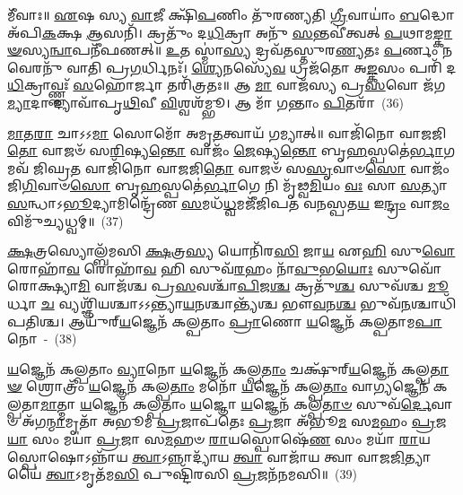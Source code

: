 𑌮𑍀᳴𑌵𑌾𑌃॥ \ul{𑌏}\-𑌷 𑌸𑍍𑌯 \ul{𑌵𑌾}\-𑌜𑍀 𑌕𑍍𑌷𑌿᳴\-\ul{𑌪}\-𑌣𑌿𑌂 𑌤𑍁᳴𑌰𑌣𑍍𑌯𑌤𑌿 \ul{𑌗𑍍𑌰𑍀}\-𑌵𑌾𑌯𑌾𑌂॑ \ul{𑌬}\-𑌦𑍍𑌧𑍋 𑌅᳴𑌪𑌿\-\ul{𑌕}\-𑌕𑍍𑌷 \ul{𑌆}\-𑌸𑌨𑌿᳴। 𑌕𑍍𑌰𑌤𑍁𑌂᳴ 𑌦\-\ul{𑌧𑌿}\-𑌕𑍍𑌰𑌾 𑌅𑌨𑍁᳴ \ul{𑌸}\-𑌨𑍍𑌤𑌵𑍀॑𑌤𑍍𑌵𑌤𑍍 \ul{𑌪}\-𑌥𑌾𑌮\-\ul{𑌙𑍍𑌕𑌾}\-\-\ul{𑍟}\-𑌸𑍍𑌯\-\ul{𑌨𑍍𑌵𑌾}\-𑌪𑌨𑍀᳴𑌫𑌣𑌤𑍍॥ \ul{𑌉}\-𑌤 𑌸𑍍𑌮𑌾॑\-\ul{𑌸𑍍𑌯} 𑌦𑍍𑌰𑌵᳴𑌤𑌸𑍍𑌤𑍁𑌰\-\ul{𑌣𑍍𑌯}\-𑌤𑌃 \ul{𑌪}\-𑌰𑍍𑌣𑌂 𑌨 𑌵𑍇𑌰𑌨𑍁᳴ 𑌵𑌾𑌤𑌿 𑌪𑍍𑌰\-\ul{𑌗}\-𑌰𑍍𑌧𑌿𑌨𑌃᳴। \ul{𑌶𑍍𑌯𑍇}\-𑌨𑌸𑍍𑌯𑍇᳴\-\ul{𑌵} 𑌧𑍍𑌰𑌜᳴𑌤𑍋 𑌅\-\ul{𑌙𑍍𑌕}\-𑌸𑌂 𑌪𑌰𑌿᳴ 𑌦\-\ul{𑌧𑌿}\-𑌕𑍍𑌰𑌾𑌵𑍍𑌣𑍍𑌣𑌃᳴ \ul{𑌸}\-𑌹𑍋𑌰𑍍𑌜𑌾 𑌤𑌰𑌿᳴𑌤𑍍𑌰𑌤𑌃॥ 𑌆 \ul{𑌮𑌾} 𑌵𑌾𑌜᳴𑌸𑍍𑌯 𑌪𑍍𑌰\-\ul{𑌸}\-𑌵𑍋 𑌜᳴𑌗\-\ul{𑌮𑍍𑌯𑌾}\-𑌦𑌾 𑌦𑍍𑌯𑌾𑌵𑌾᳴𑌪𑍃\-\ul{𑌥𑌿}\-𑌵𑍀 \ul{𑌵𑌿}\-𑌶𑍍𑌵𑌶᳴𑌮𑍍𑌭𑍂। 𑌆 𑌮𑌾᳴ 𑌗𑌨𑍍𑌤𑌾𑌂 \ul{𑌪𑌿}\-𑌤𑌰𑌾᳴~(36)

\-\ul{𑌮𑌾}\-𑌤\-\ul{𑌰𑌾} 𑌚𑌾\-𑌽\-𑌽\-\ul{𑌮𑌾} 𑌸𑍋𑌮𑍋᳴ 𑌅𑌮𑍃\-\ul{𑌤}\-𑌤𑍍𑌵𑌾𑌯᳴ 𑌗𑌮𑍍𑌯𑌾𑌤𑍍॥ 𑌵𑌾𑌜𑌿᳴𑌨𑍋 𑌵𑌾𑌜𑌜𑌿\-\ul{𑌤𑍋} 𑌵𑌾𑌜𑍞᳴ 𑌸\-\ul{𑌰𑌿}\-𑌷𑍍𑌯\-\ul{𑌨𑍍𑌤𑍋} 𑌵𑌾𑌜𑌂᳴ \ul{𑌜𑍇}\-𑌷𑍍𑌯\-\ul{𑌨𑍍𑌤𑍋} 𑌬𑍃\-\ul{𑌹}\-𑌸𑍍𑌪𑌤𑍇॑\-\ul{𑌰𑍍𑌭𑌾}\-𑌗𑌮𑌵᳴ 𑌜𑌿𑌘𑍍𑌰\-\ul{𑌤} 𑌵𑌾𑌜𑌿᳴𑌨𑍋 𑌵𑌾𑌜𑌜𑌿\-\ul{𑌤𑍋} 𑌵𑌾𑌜𑍞᳴ 𑌸\-\ul{𑌸𑍃}\-𑌵𑌾𑍞\-\ul{𑌸𑍋} 𑌵𑌾𑌜𑌂᳴ 𑌜𑌿\-\ul{𑌗𑌿}\-𑌵𑌾𑍞\-\ul{𑌸𑍋} 𑌬𑍃\-\ul{𑌹}\-𑌸𑍍𑌪𑌤𑍇॑\-\ul{𑌰𑍍𑌭𑌾}\-𑌗𑍇 𑌨𑌿 𑌮𑍃᳴𑌢𑍍𑌵\-\ul{𑌮𑌿}\-𑌯𑌂 \ul{𑌵𑌃} 𑌸𑌾 \ul{𑌸}\-𑌤𑍍𑌯𑌾 \ul{𑌸}\-𑌨𑍍𑌧𑌾\-𑌽\-\ul{𑌭𑍂}\-𑌦𑍍𑌯𑌾𑌮𑌿𑌨𑍍𑌦𑍍𑌰𑍇᳴𑌣 \ul{𑌸}\-𑌮𑌧᳴\-\ul{𑌧𑍍𑌵}\-𑌮𑌜𑍀᳴𑌜𑌿𑌪𑌤 𑌵𑌨𑌸𑍍𑌪𑌤\-\ul{𑌯} 𑌇\-\ul{𑌨𑍍𑌦𑍍𑌰𑌂} 𑌵𑌾\-\ul{𑌜𑌂} 𑌵𑌿𑌮𑍁᳴𑌚𑍍𑌯𑌧𑍍𑌵𑌮𑍍॥~(37)

{\anuvakamend[{\-\ul{𑌸𑍍𑌕}\-\-\ul{𑌭𑍍𑌨𑍀}\-\-\ul{𑌤} \ul{𑌯𑍁}\-\-\ul{𑌯}\-\-\ul{𑌵}\-\-\ul{𑌨𑍍𑌪𑌿}\-𑌤\-\ul{𑌰𑌾} 𑌦𑍍𑌵𑌿𑌚᳴𑌤𑍍𑌵𑌾𑌰𑌿𑍞𑌶𑌚𑍍𑌚}]}%

\-\ul{𑌕𑍍𑌷}\-𑌤𑍍𑌰𑌸𑍍𑌯𑍋𑌲𑍍𑌬᳴𑌮𑌸𑌿 \ul{𑌕𑍍𑌷}\-𑌤𑍍𑌰\-\ul{𑌸𑍍𑌯} 𑌯𑍋𑌨𑌿᳴𑌰\-\ul{𑌸𑌿} 𑌜𑌾\-\ul{𑌯} 𑌏\-\ul{𑌹𑌿} 𑌸𑍁\-\ul{𑌵𑍋} 𑌰𑍋𑌹𑌾᳴\-\ul{𑌵} 𑌰𑍋𑌹𑌾᳴\-\ul{𑌵} 𑌹𑌿 𑌸𑍁𑌵᳴\-\ul{𑌰}\-𑌹𑌂 𑌨𑌾᳴\-\ul{𑌵𑍁}\-𑌭\-\ul{𑌯𑍋𑌃} 𑌸𑍁𑌵𑍋᳴ 𑌰𑍋𑌕𑍍𑌷𑍍𑌯𑌾\-\ul{𑌮𑌿} 𑌵𑌾𑌜᳴𑌶𑍍𑌚 𑌪𑍍𑌰\-\ul{𑌸}\-𑌵𑌶𑍍𑌚𑌾᳴\-\ul{𑌪𑌿}\-𑌜\-\ul{𑌶𑍍𑌚} 𑌕𑍍𑌰𑌤𑍁᳴\-\ul{𑌶𑍍𑌚} 𑌸𑍁𑌵᳴𑌶𑍍𑌚 \ul{𑌮𑍂}\-𑌰𑍍𑌧𑌾 \ul{𑌚} 𑌵𑍍𑌯𑌶𑍍𑌞𑌿᳴𑌯𑌶𑍍𑌚𑌾\-𑌽\-𑌽𑌨𑍍𑌤𑍍𑌯𑌾\-\ul{𑌯}\-𑌨𑌶𑍍𑌚𑌾𑌨𑍍𑌤𑍍𑌯᳴𑌶𑍍𑌚 𑌭𑍗\-\ul{𑌵}\-𑌨\-\ul{𑌶𑍍𑌚} 𑌭𑍁𑌵᳴\-\ul{𑌨}\-𑌶𑍍𑌚𑌾𑌧𑌿᳴𑌪𑌤𑌿𑌶𑍍𑌚। 𑌆𑌯𑍁᳴𑌰𑍍‌\-\ul{𑌯}\-𑌜𑍍𑌞𑍇𑌨᳴ 𑌕𑌲𑍍𑌪𑌤𑌾𑌂 \ul{𑌪𑍍𑌰𑌾}\-𑌣𑍋 \ul{𑌯}\-𑌜𑍍𑌞𑍇𑌨᳴ 𑌕𑌲𑍍𑌪𑌤𑌾𑌮\-\ul{𑌪𑌾}\-𑌨𑍋~-~(38)

\-\ul{𑌯}\-𑌜𑍍𑌞𑍇𑌨᳴ 𑌕𑌲𑍍𑌪𑌤𑌾𑌂 \ul{𑌵𑍍𑌯𑌾}\-𑌨𑍋 \ul{𑌯}\-𑌜𑍍𑌞𑍇𑌨᳴ 𑌕𑌲𑍍𑌪\-\ul{𑌤𑌾𑌂} 𑌚𑌕𑍍𑌷𑍁᳴𑌰𑍍‌\-\ul{𑌯}\-𑌜𑍍𑌞𑍇𑌨᳴ 𑌕𑌲𑍍𑌪\-\ul{𑌤𑌾}\-\-\ul{𑍟} 𑌶𑍍𑌰𑍋𑌤𑍍𑌰𑌂᳴ \ul{𑌯}\-𑌜𑍍𑌞𑍇𑌨᳴ 𑌕𑌲𑍍𑌪\-\ul{𑌤𑌾𑌂} 𑌮𑌨𑍋᳴ \ul{𑌯}\-𑌜𑍍𑌞𑍇𑌨᳴ 𑌕𑌲𑍍𑌪\-\ul{𑌤𑌾𑌂} 𑌵𑌾\-\ul{𑌗𑍍𑌯}\-𑌜𑍍𑌞𑍇𑌨᳴ 𑌕𑌲𑍍𑌪𑌤𑌾\-\ul{𑌮𑌾}\-𑌤𑍍𑌮𑌾 \ul{𑌯}\-𑌜𑍍𑌞𑍇𑌨᳴ 𑌕𑌲𑍍𑌪𑌤𑌾𑌂 \ul{𑌯}\-𑌜𑍍𑌞𑍋 \ul{𑌯}\-𑌜𑍍𑌞𑍇𑌨᳴ 𑌕𑌲𑍍𑌪\-\ul{𑌤𑌾}\-\-\ul{𑍞} 𑌸𑍁𑌵᳴\-\ul{𑌰𑍍𑌦𑍇}\-𑌵𑌾𑍞 𑌅᳴𑌗\-\ul{𑌨𑍍𑌮𑌾}\-𑌮𑍃𑌤𑌾᳴ 𑌅𑌭𑍂𑌮 \ul{𑌪𑍍𑌰}\-𑌜𑌾𑌪᳴𑌤𑍇𑌃 \ul{𑌪𑍍𑌰}\-𑌜𑌾 𑌅᳴𑌭𑍂\-\ul{𑌮} 𑌸\-\ul{𑌮}\-𑌹𑌂 \ul{𑌪𑍍𑌰}\-𑌜\-\ul{𑌯𑌾} 𑌸𑌂 𑌮𑌯𑌾॑ \ul{𑌪𑍍𑌰}\-𑌜𑌾 𑌸\-\ul{𑌮}\-𑌹𑍞 \ul{𑌰𑌾}\-𑌯𑌸𑍍𑌪𑍋𑌷𑍇᳴\-\ul{𑌣} 𑌸𑌂 𑌮𑌯𑌾᳴ \ul{𑌰𑌾}\-𑌯𑌸𑍍𑌪𑍋𑌷𑍋\-𑌽𑌨𑍍𑌨𑌾᳴𑌯 \ul{𑌤𑍍𑌵𑌾}\-\-𑌽𑌨𑍍𑌨𑌾𑌦𑍍𑌯𑌾᳴𑌯 \ul{𑌤𑍍𑌵𑌾} 𑌵𑌾𑌜𑌾᳴𑌯 𑌤𑍍𑌵𑌾 𑌵𑌾𑌜\-\ul{𑌜𑌿}\-𑌤𑍍𑌯𑌾𑌯𑍈॑ \ul{𑌤𑍍𑌵𑌾}\-\-𑌽𑌮𑍃𑌤᳴𑌮\-\ul{𑌸𑌿} 𑌪𑍁𑌷𑍍𑌟𑌿᳴𑌰𑌸𑌿 \ul{𑌪𑍍𑌰}\-𑌜𑌨᳴𑌨𑌮𑌸𑌿॥~(39)

